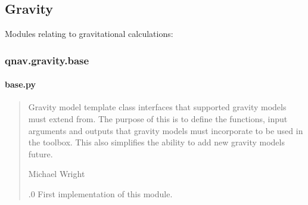 \documentclass[letterpaper,10pt,english]{sphinxmanual}
\begin{document}
\subsection{Gravity}
\label{\detokenize{usage/packages:gravity}}
\sphinxAtStartPar
Modules relating to gravitational calculations:

\sphinxstepscope


\subsubsection{qnav.gravity.base}
\label{\detokenize{modules/gravity/base:module-qnav.gravity.base}}\label{\detokenize{modules/gravity/base:qnav-gravity-base}}\label{\detokenize{modules/gravity/base::doc}}

\paragraph{base.py}
\label{\detokenize{modules/gravity/base:base-py}}\begin{quote}\begin{description}
\sphinxAtStartPar
Gravity model template class interfaces that supported gravity models
must extend from. The purpose of this is to define the functions, input
arguments and outputs that gravity models must incorporate to be used
in the toolbox. This also simplifies the ability to add new gravity
models future.

\sphinxAtStartPar
Michael Wright \sphinxhyphen{} 

.0 \sphinxhyphen{} First implementation of this module.

\end{description}\end{quote}
\end{document}
